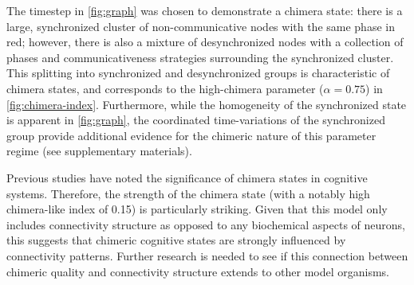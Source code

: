 \documentclass[pdflatex,lineno,referee,sn-mathphys-ay]{sn-jnl}
\begin{document}
The timestep in \cref{fig:graph} was chosen
to demonstrate a chimera state:
there is a large, synchronized cluster
of non-communicative nodes with the same phase in red;
however, there is also a mixture of desynchronized nodes
with a collection of phases and communicativeness strategies
surrounding the synchronized cluster.
This splitting into synchronized and desynchronized groups
is characteristic of chimera states,
and corresponds to the high-chimera parameter ($\alpha = 0.75$)
in \cref{fig:chimera-index}.
Furthermore, while the homogeneity of the synchronized state is apparent
in \cref{fig:graph},
the coordinated time-variations of the synchronized group
provide additional evidence for the chimeric nature
of this parameter regime (see supplementary materials).

Previous studies \citep[\eg][]{bansal2019cognitive,santos2017chimera}
have noted the significance of chimera states in cognitive systems.
Therefore, the strength of the chimera state
(with a notably high chimera-like index of \num{0.15}) is particularly striking.
Given that this model only includes connectivity structure
as opposed to any biochemical aspects of neurons,
this suggests that chimeric cognitive states are strongly influenced
by connectivity patterns.
Further research is needed to see if this connection between chimeric quality
and connectivity structure extends to other model organisms.
\end{document}
